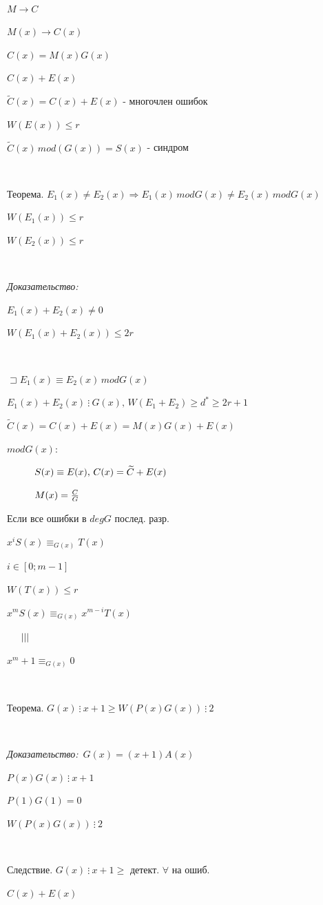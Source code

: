\documentclass[12pt]{article}
\begin{document}
$ $\par
$M \to C$\par
$M(x) \to C(x)$\par
$C(x) = M(x)G(x)$\par
$C(x)+E(x)$\par
$\widetilde{C}(x)= C(x)+E(x)$ - многочлен ошибок\par
\textit{$W(E(x)) \leq r$}\par
$\widetilde{C}(x) \, mod(G(x))=S(x)$ - синдром \par
$ $\par
Теорема. $E_1(x) \neq E_2(x) \Rightarrow E_1(x) \, mod G(x) \neq E_2(x) \, mod G(x)$\par
$W(E_1(x)) \leq r$\par
$W(E_2(x)) \leq r$\par
$ $\par
\textit{Доказательство:}\par
$E_1(x) + E_2(x) \neq 0$\par
$W(E_1(x)+E_2(x)) \leq 2r$\par
$ $\par
$\sqsupset E_1(x) \equiv E_2(x) \, mod G(x)$\par
$E_1(x)+E_2(x) \ \vdots\  G(x), \, W(E_1+E_2) \geq d^* \geq 2r+1$\par
$\widetilde{C}(x)=C(x)+E(x) = M(x)G(x)+E(x)$\par
$mod G(x):$\par
$\hspace{1 cm} S(x) \equiv E(x), \, C(x) = \widetilde{C}+E(x)$\par
$\hspace{1 cm} M(x) = \frac{C}{G}$\par
Если все ошибки в $deg G$ послед.  разр.\par
$x^i S(x) \equiv_{G(x)}T(x)$\par
$i \in [0;m-1]$\par
$W(T(x)) \leq r$\par
$x^mS(x) \equiv_{G(x)} x^{m-i}T(x)$\par
$\hspace{5 mm} |||$\par
$x^m+1 \equiv_{G(x)}0$\par
$ $\par
Теорема. $G(x) \ \vdots\  x+1 \geq W(P(x)G(x)) \ \vdots\  2$\par
$ $\par
\textit{Доказательство:} $\, G(x) = (x+1)A(x)$\par
$P(x)G(x) \ \vdots\  x+1$\par
$P(1)G(1) = 0$\par
$W(P(x)G(x)) \ \vdots\  2$\par
$ $\par
Следствие. $G(x) \ \vdots\  x+1 \geq$ детект. $\forall$ на ошиб.\par
$C(x)+E(x)$\par
\end{document}
